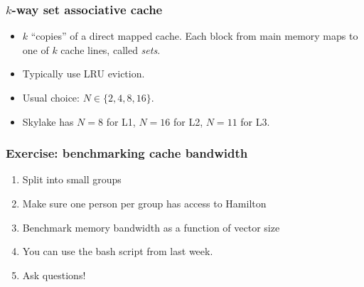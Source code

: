 \documentclass[dvipsnames,presentation,aspectratio=169,14pt]{beamer}
\begin{document}
\begin{frame}
  \frametitle{$k$-way set associative cache}
    \begin{itemize}[itemsep=8pt]
    \item $k$ ``copies'' of a direct mapped cache.  Each block from main
      memory maps to one of $k$ cache lines, called \emph{sets}.
    \item Typically use LRU eviction.
    \item Usual choice: $N \in \{2, 4, 8, 16\}$.
    \item Skylake has $N = 8$ for L1, $N = 16$ for L2, $N = 11$
      for L3.
    \end{itemize}
\end{frame}

\begin{frame}
  \frametitle{Exercise: benchmarking cache bandwidth}
  \begin{enumerate}[itemsep=8pt]
    \item Split into small groups
    \item Make sure one person per group has access to Hamilton
    \item Benchmark memory bandwidth as a function of vector size
    \item You can use the bash script from last week.
    \item Ask questions!
    \end{enumerate}
  \end{frame}
\end{document}
